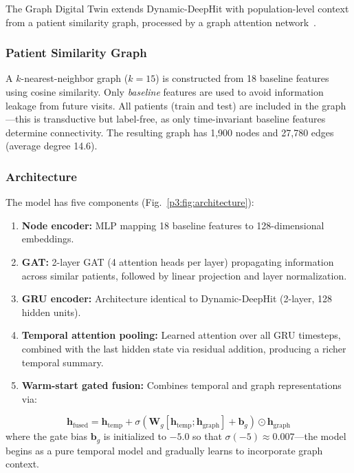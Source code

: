 The Graph Digital Twin extends Dynamic-DeepHit with population-level context from a patient similarity graph, processed by a graph attention network~\cite{velickovic2018}.

\subsubsection{Patient Similarity Graph}

A $k$-nearest-neighbor graph ($k{=}15$) is constructed from 18 baseline features using cosine similarity. Only \textit{baseline} features are used to avoid information leakage from future visits. All patients (train and test) are included in the graph---this is transductive but label-free, as only time-invariant baseline features determine connectivity. The resulting graph has 1,900 nodes and 27,780 edges (average degree 14.6).

\subsubsection{Architecture}

The model has five components (Fig.~\ref{p3:fig:architecture}):
\begin{enumerate}
    \item \textbf{Node encoder:} MLP mapping 18 baseline features to 128-dimensional embeddings.
    \item \textbf{GAT:} 2-layer GAT (4 attention heads per layer) propagating information across similar patients, followed by linear projection and layer normalization.
    \item \textbf{GRU encoder:} Architecture identical to Dynamic-DeepHit (2-layer, 128 hidden units).
    \item \textbf{Temporal attention pooling:} Learned attention over all GRU timesteps, combined with the last hidden state via residual addition, producing a richer temporal summary.
    \item \textbf{Warm-start gated fusion:} Combines temporal and graph representations via:
\end{enumerate}
\begin{equation}
    \mathbf{h}_\text{fused} = \mathbf{h}_\text{temp} + \sigma\!\left(\mathbf{W}_g[\mathbf{h}_\text{temp}; \mathbf{h}_\text{graph}] + \mathbf{b}_g\right) \odot \mathbf{h}_\text{graph}
\end{equation}
where the gate bias $\mathbf{b}_g$ is initialized to $-5.0$ so that $\sigma(-5) \approx 0.007$---the model begins as a pure temporal model and gradually learns to incorporate graph context.


